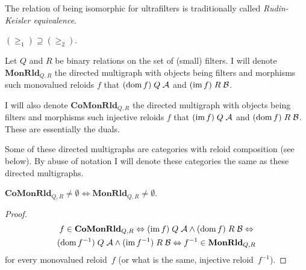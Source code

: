 \begin{rem}
The relation of being isomorphic
for ultrafilters is traditionally called \emph{Rudin-Keisler equivalence}.\end{rem}
\begin{obvious}
$(\ge_{1})\supseteq(\ge_{2})$.\end{obvious}
\begin{defn}
Let $Q$ and $R$ be binary relations on the set of (small) filters. I will
denote $\mathbf{MonRld}_{Q,R}$ the directed multigraph with objects
being filters and morphisms such monovalued reloids $f$ that $(\operatorname{dom} f)\mathrel Q\mathcal{A}$
and $(\operatorname{im} f)\mathrel R\mathcal{B}$.

I will also denote $\mathbf{CoMonRld}_{Q,R}$ the directed multigraph
with objects being filters and morphisms such injective reloids $f$
that $(\operatorname{im} f)\mathrel Q\mathcal{A}$ and $(\operatorname{dom} f)\mathrel R\mathcal{B}$.
These are essentially the duals.
\end{defn}
Some of these directed multigraphs are categories with reloid composition
(see below). By abuse of notation I will denote these categories the
same as these directed multigraphs.

\begin{lem}
$\mathbf{CoMonRld}_{Q,R}\ne\emptyset \Leftrightarrow\mathbf{MonRld}_{Q,R}\ne\emptyset$.
\end{lem}
\begin{proof}
\begin{multline*}
f\in\mathbf{CoMonRld}_{Q,R} \Leftrightarrow
(\operatorname{im} f)\mathrel Q\mathcal{A} \land (\operatorname{dom} f)\mathrel R\mathcal{B} \Leftrightarrow \\
(\operatorname{dom} f^{-1})\mathrel Q\mathcal{A} \land (\operatorname{im} f^{-1})\mathrel R\mathcal{B} \Leftrightarrow
f^{-1}\in\mathbf{MonRld}_{Q,R}
\end{multline*}
for every monovalued reloid~$f$ (or what is the same, injective reloid~$f^{-1}$).
\end{proof}

